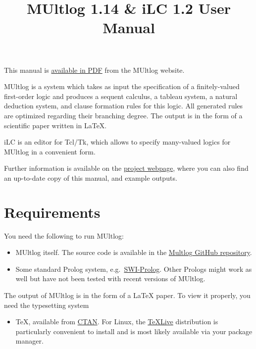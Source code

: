 \documentclass[]{article}
\title{MUltlog 1.14 \& iLC 1.2 User Manual}
\date{}
\providecommand{\tightlist}{%
  \setlength{\itemsep}{0pt}\setlength{\parskip}{0pt}}
\begin{document}
\maketitle

{
\setcounter{tocdepth}{2}
\tableofcontents
}
This manual is \href{https://logic.at/multlog/multlog.pdf}{available in
PDF} from the MUltlog website.

MUltlog is a system which takes as input the specification of a
finitely-valued first-order logic and produces a sequent calculus, a
tableau system, a natural deduction system, and clause formation rules
for this logic. All generated rules are optimized regarding their
branching degree. The output is in the form of a scientific paper
written in LaTeX.

iLC is an editor for Tcl/Tk, which allows to specify many-valued logics
for MUltlog in a convenient form.

Further information is available on the
\href{http://www.logic.at/multlog/}{project webpage}, where you can also
find an up-to-date copy of this manual, and example outputs.

\hypertarget{requirements}{%
\section{Requirements}\label{requirements}}

You need the following to run MUltlog:

\begin{itemize}
\item
  MUltlog itself. The source code is available in the
  \href{https://github.com/rzach/multlog}{Multlog GitHub repository}.
\item
  Some standard Prolog system,
  e.g.~\href{https://www.swi-prolog.org/}{SWI-Prolog}. Other Prologs
  might work as well but have not been tested with recent versions of
  MUltlog.
\end{itemize}

The output of MUltlog is in the form of a LaTeX paper. To view it
properly, you need the typesetting system

\begin{itemize}
\tightlist
\item
  TeX, available from \href{https://ctan.org/}{CTAN}. For Linux, the
  \href{https://www.tug.org/texlive/}{TeXLive} distribution is
  particularly convenient to install and is most likely available via
  your package manager.
\end{itemize}
\end{document}

